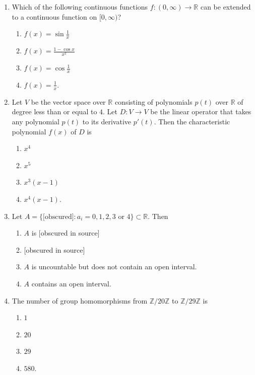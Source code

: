 \documentclass[11pt, a4paper]{article}
\begin{document}
\begin{enumerate}
  \item Which of the following continuous functions $f: (0, \infty) \to \mathbb{R}$ can be extended to a continuous function on $[0, \infty)$?
  \begin{enumerate}[label=\Alph*.]
    \item $f(x) = \sin\frac{1}{x}$
    \item $f(x) = \frac{1 - \cos x}{x^2}$
    \item $f(x) = \cos\frac{1}{x}$
    \item $f(x) = \frac{1}{x}$.
  \end{enumerate}

  \item Let $V$ be the vector space over $\mathbb{R}$ consisting of polynomials $p(t)$ over $\mathbb{R}$ of degree less than or equal to $4$. Let $D: V \to V$ be the linear operator that takes any polynomial $p(t)$ to its derivative $p'(t)$. Then the characteristic polynomial $f(x)$ of $D$ is
  \begin{enumerate}[label=\Alph*.]
    \item $x^4$
    \item $x^5$
    \item $x^3(x - 1)$
    \item $x^4(x - 1)$.
  \end{enumerate}

  \item Let $A = \{\text{[obscured]} : a_i = 0, 1, 2, 3 \text{ or } 4\} \subset \mathbb{R}$. Then
  \begin{enumerate}[label=\Alph*.]
    \item $A$ is {[obscured in source]}
    \item {[obscured in source]}
    \item $A$ is uncountable but does not contain an open interval.
    \item $A$ contains an open interval.
  \end{enumerate}

  \item The number of group homomorphisms from $\mathbb{Z}/20\mathbb{Z}$ to $\mathbb{Z}/29\mathbb{Z}$ is
  \begin{enumerate}[label=\Alph*.]
    \item $1$
    \item $20$
    \item $29$
    \item $580$.
  \end{enumerate}


\end{enumerate}
\end{document}

